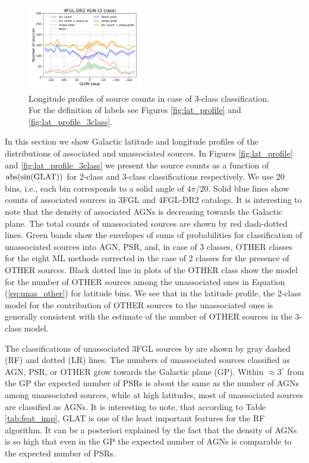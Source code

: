 \begin{figure}[h]
\includegraphics[width=0.45\textwidth]{plots/lon_profile_AGN_4FGL-DR2_3classes.pdf}
\caption{Longitude profiles of source counts in case of 3-class classification. For the definition of labels see Figures \ref{fig:lat_profile} and \ref{fig:lat_profile_3class}.}  
\label{fig:lon_profile_3class}
\end{figure}


In this section we show Galactic latitude and longitude profiles of the distributions of associated and unassociated sources.
In Figures \ref{fig:lat_profile} and \ref{fig:lat_profile_3class} we present the source counts as a function of ${\rm abs(sin(GLAT))}$ 
for 2-class and 3-class classifications respectively.
We use 20 bins, i.e., each bin corresponds to a solid angle of $4 \pi / 20$. 
Solid blue lines show counts of associated sources in 3FGL and 4FGL-DR2  catalogs.
It is interesting to note that the density of associated AGNs is decreasing towards the Galactic plane.
The total counts of unassociated sources are shown by red dash-dotted lines.
Green bands show the envelopes of sums of probabilities for classification of unassociated sources into AGN, PSR, and, in case of 3 classes, OTHER classes for the eight ML methods corrected in the case of 2 classes for the presence of OTHER sources.
Black dotted line in plots of the OTHER class show the model for the number of OTHER sources among the unassociated ones
in Equation (\ref{eq:unas_other}) for latitude bins.
We see that in the latitude profile, the 2-class model for the contribution of OTHER sources to the unassociated ones is generally consistent with the estimate of the number of OTHER sources in the 3-class model.

The classifications of unassociated 3FGL sources by \cite{2016ApJ...820....8S} are shown by gray dashed (RF) and dotted (LR) lines.
The numbers of unassociated sources classified as AGN, PSR, or OTHER grow towards the Galactic plane (GP).
Within $\approx 3^\circ$ from the GP the expected number of PSRs is about the same as the number of AGNs among unassociated sources, while at high latitudes, most of unassociated sources are classified as AGNs.
It is interesting to note, that according to Table \ref{tab:feat_imp}, GLAT is one of the least important features for the RF algorithm.
It can be a posteriori explained by the fact that the density of AGNs is so high that even in the GP the expected number of AGNs is comparable to the expected number of PSRs.

